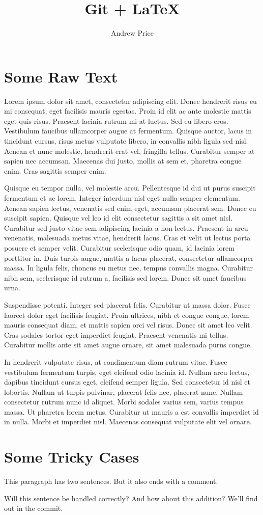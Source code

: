 \documentclass[12pt,twocolumn,letter]{article}
\begin{document}
\title{Git + \LaTeX}
\author{Andrew Price}
\maketitle

\section{Some Raw Text}
Lorem ipsum dolor sit amet, consectetur adipiscing elit. %
Donec hendrerit risus eu mi consequat, eget facilisis mauris egestas. %
Proin id elit ac ante molestie mattis eget quis risus. %
Praesent lacinia rutrum mi at luctus. %
Sed eu libero eros. %
Vestibulum faucibus ullamcorper augue at fermentum. %
Quisque auctor, lacus in tincidunt cursus, risus metus vulputate libero, in convallis nibh ligula sed nisl. %
Aenean et nunc molestie, hendrerit erat vel, fringilla tellus. %
Curabitur semper at sapien nec accumsan. %
Maecenas dui justo, mollis at sem et, pharetra congue enim. %
Cras sagittis semper enim.

Quisque eu tempor nulla, vel molestie arcu. %
Pellentesque id dui ut purus suscipit fermentum et ac lorem. %
Integer interdum nisl eget nulla semper elementum. %
Aenean sapien lectus, venenatis sed enim eget, accumsan placerat sem. %
Donec eu suscipit sapien. %
Quisque vel leo id elit consectetur sagittis a sit amet nisl. %
Curabitur sed justo vitae sem adipiscing lacinia a non lectus. %
Praesent in arcu venenatis, malesuada metus vitae, hendrerit lacus. %
Cras et velit ut lectus porta posuere et semper velit. %
Curabitur scelerisque odio quam, id lacinia lorem porttitor in. %
Duis turpis augue, mattis a lacus placerat, consectetur ullamcorper massa. %
In ligula felis, rhoncus eu metus nec, tempus convallis magna. %
Curabitur nibh sem, scelerisque id rutrum a, facilisis sed lorem. %
Donec sit amet faucibus urna.

Suspendisse potenti. %
Integer sed placerat felis. %
Curabitur ut massa dolor. %
Fusce laoreet dolor eget facilisis feugiat. %
Proin ultrices, nibh et congue congue, lorem mauris consequat diam, et mattis sapien orci vel risus. %
Donec sit amet leo velit. %
Cras sodales tortor eget imperdiet feugiat. %
Praesent venenatis mi tellus. %
Curabitur mollis ante sit amet augue ornare, sit amet malesuada purus congue.

In hendrerit vulputate risus, at condimentum diam rutrum vitae. %
Fusce vestibulum fermentum turpis, eget eleifend odio lacinia id. %
Nullam arcu lectus, dapibus tincidunt cursus eget, eleifend semper ligula. %
Sed consectetur id nisl et lobortis. %
Nullam ut turpis pulvinar, placerat felis nec, placerat nunc. %
Nullam consectetur rutrum nunc id aliquet. %
Morbi sodales varius sem, varius tempus massa. %
Ut pharetra lorem metus. %
Curabitur ut mauris a est convallis imperdiet id in nulla. %
Morbi et imperdiet nisl. %
Maecenas consequat vulputate elit vel ornare.


\section{Some Tricky Cases}

This paragraph has two sentences. But it also ends with a comment. %

Will this sentence be handled correctly? %
And how about this addition? %
We'll find out in the commit.
\end{document}
